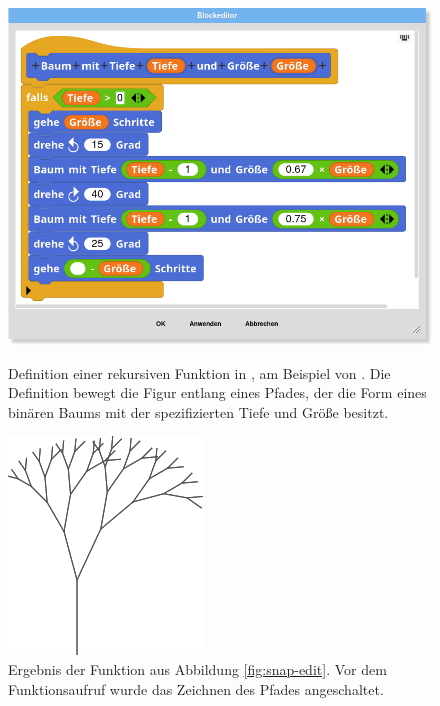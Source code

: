 \begin{figure}[!ht]
  \includegraphics[width=\linewidth]{assets/snap-edit.png}
  \caption[Definition einer rekursiven Funktion in \Snap{}]{Definition einer rekursiven Funktion in \Snap{}, am Beispiel von \textcite{harveyBringingNo2010}. Die Definition bewegt die Figur entlang eines Pfades, der die Form eines binären Baums mit der spezifizierten Tiefe und Größe besitzt.}
  \label{fig:snap-edit}
  \endminipage
  \hfill
  \begin{minipage}[t]{.405\textwidth}
    \includegraphics[width=\linewidth]{assets/snap-tree.png}
    \caption[Ergebnis der Funktion aus Abbildung \ref*{fig:snap-edit}]{Ergebnis der Funktion aus Abbildung \ref{fig:snap-edit}. Vor dem Funktionsaufruf wurde das Zeichnen des Pfades angeschaltet.}
    \label{fig:snap-tree}
  \end{minipage}
\end{figure}

